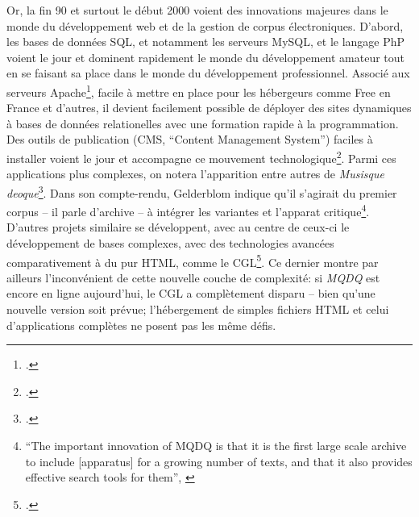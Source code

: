 Or, la fin 90 et surtout le début 2000 voient des innovations majeures dans le monde du développement web et de la gestion de corpus électroniques. D'abord, les bases de données SQL, et notamment les serveurs MySQL, et le langage PhP voient le jour et dominent rapidement le monde du développement amateur tout en se faisant sa place dans le monde du développement professionnel. Associé aux serveurs Apache\footcite{smith_lamp_nodate}, facile à mettre en place pour les hébergeurs comme Free en France et d'autres, il devient facilement possible de déployer des sites dynamiques à bases de données relationelles avec une formation rapide à la programmation. Des outils de publication (CMS, ``Content Management System'') faciles à installer voient le jour et accompagne ce mouvement technologique\footcite{purer_php_nodate}. Parmi ces applications plus complexes, on notera l'apparition entre autres de \textit{Musisque deoque}\footcite{gelderblom_musisque_2008}. Dans son compte-rendu, Gelderblom indique qu'il s'agirait du premier corpus -- il parle d'archive -- à intégrer les variantes et l'apparat critique\footnote{``The important innovation of MQDQ is that it is the first large scale archive to include [apparatus] for a growing number of texts, and that it also provides effective search tools for them'', \cite[p.233]{gelderblom_musisque_2008}}. D'autres projets similaire se développent, avec au centre de ceux-ci le développement de bases complexes, avec des technologies avancées comparativement à du pur HTML, comme le CGL\footcite{garcea_corpus_2010}. Ce dernier montre par ailleurs l'inconvénient de cette nouvelle couche de complexité: si \textit{MQDQ} est encore en ligne aujourd'hui, le CGL a complètement disparu -- bien qu'une nouvelle version soit prévue; l'hébergement de simples fichiers HTML et celui d'applications complètes ne posent pas les même défis.

